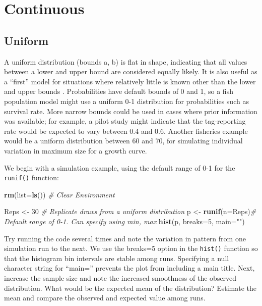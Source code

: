 \documentclass[
]{krantz}
\makeatletter
\newenvironment{Shaded}{\begin{snugshade}}{\end{snugshade}}
\newcommand{\AttributeTok}[1]{\textcolor[rgb]{0.27,0.27,0.27}{#1}}
\newcommand{\CommentTok}[1]{\textcolor[rgb]{0.37,0.37,0.37}{\textit{#1}}}
\newcommand{\DecValTok}[1]{\textcolor[rgb]{0.06,0.06,0.06}{#1}}
\newcommand{\FunctionTok}[1]{\textcolor[rgb]{0.27,0.27,0.27}{\textbf{#1}}}
\newcommand{\NormalTok}[1]{#1}
\newcommand{\OtherTok}[1]{\textcolor[rgb]{0.37,0.37,0.37}{#1}}
\newcommand{\StringTok}[1]{\textcolor[rgb]{0.5,0.5,0.5}{#1}}
\newenvironment{kframe}{%
\medskip{}
\setlength{\fboxsep}{.8em}
 \def\at@end@of@kframe{}%
 \ifinner\ifhmode%
  \def\at@end@of@kframe{\end{minipage}}%
  \begin{minipage}{\columnwidth}%
 \fi\fi%
 \def\FrameCommand##1{\hskip\@totalleftmargin \hskip-\fboxsep
 \colorbox{shadecolor}{##1}\hskip-\fboxsep
     \hskip-\linewidth \hskip-\@totalleftmargin \hskip\columnwidth}%
 \MakeFramed {\advance\hsize-\width
   \@totalleftmargin\z@ \linewidth\hsize
   \@setminipage}}%
 {\par\unskip\endMakeFramed%
 \at@end@of@kframe}
\renewenvironment{Shaded}{\begin{kframe}}{\end{kframe}}
\makeatother
\begin{document}
\hypertarget{Continuous}{%
\section{Continuous}\label{Continuous}}

\hypertarget{Uniform}{%
\subsection{Uniform}\label{Uniform}}

A uniform distribution (bounds a, b) is flat in shape, indicating that all values between a lower and upper bound are considered equally likely. It is also useful as a ``first'' model for situations where relatively little is known other than the lower and upper bounds \citep{law.kelton_1982}. Probabilities have default bounds of 0 and 1, so a fish population model might use a uniform 0-1 distribution for probabilities such as survival rate. More narrow bounds could be used in cases where prior information was available; for example, a pilot study might indicate that the tag-reporting rate would be expected to vary between 0.4 and 0.6. Another fisheries example would be a uniform distribution between 60 and 70, for simulating individual variation in maximum size for a growth curve.

We begin with a simulation example, using the default range of 0-1 for the \texttt{runif()} function:

\begin{Shaded}
\begin{Highlighting}[]
\FunctionTok{rm}\NormalTok{(}\AttributeTok{list=}\FunctionTok{ls}\NormalTok{()) }\CommentTok{\# Clear Environment}

\NormalTok{Reps }\OtherTok{\textless{}{-}} \DecValTok{30} \CommentTok{\# Replicate draws from a uniform distribution}
\NormalTok{p }\OtherTok{\textless{}{-}} \FunctionTok{runif}\NormalTok{(}\AttributeTok{n=}\NormalTok{Reps)}\CommentTok{\# Default range of 0{-}1. Can specify using min, max}
\FunctionTok{hist}\NormalTok{(p, }\AttributeTok{breaks=}\DecValTok{5}\NormalTok{, }\AttributeTok{main=}\StringTok{""}\NormalTok{)}
\end{Highlighting}
\end{Shaded}

Try running the code several times and note the variation in pattern from one simulation run to the next. We use the breaks=5 option in the \texttt{hist()} function so that the histogram bin intervals are stable among runs. Specifying a null character string for ``main='' prevents the plot from including a main title. Next, increase the sample size and note the increased smoothness of the observed distribution. What would be the expected mean of the distribution? Estimate the mean and compare the observed and expected value among runs.
\end{document}

